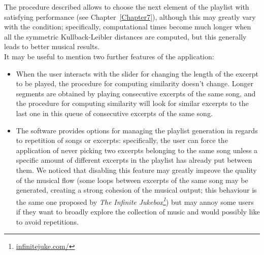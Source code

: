 \begin{enumerate}
\end{enumerate}

The procedure described allows to choose the next element of the playlist with satisfying performance (see Chapter~\ref{Chapter7}), although this may greatly vary with the condition; specifically, computational times become much longer when all the symmetric Kullback-Leibler distances are computed, but this generally leads to better musical results. \\
It may be useful to mention two further features of the application:
\begin{itemize}
\item When the user interacts with the slider for changing the length of the excerpt to be played, the procedure for computing similarity doesn't change. Longer segments are obtained by playing consecutive excerpts of the same song, and the procedure for computing similarity will look for similar excerpts to the last one in this queue of consecutive excerpts of the same song.
\item The software provides options for managing the playlist generation in regards to repetition of songs or excerpts: specifically, the user can force the application of never picking two excerpts belonging to the same song unless a specific amount of different excerpts in the playlist has already put between them. We noticed that disabling this feature may greatly improve the quality of the musical flow (some loops between excerpts of the same song may be generated, creating a strong cohesion of the musical output; this behaviour is the same one proposed by \textit{The Infinite Jukebox\footnote{\url{infinitejuke.com/}}}) but may annoy some users if they want to broadly explore the collection of music and would possibly like to avoid repetitions.
\end{itemize}


